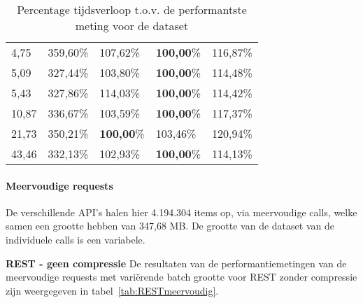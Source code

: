 \begin{table}
\begin{tabular}{lllll}
        4,75 & 359,60\% & 107,62\% & \textbf{100,00}\% & 116,87\% \\
        5,09 & 327,44\% & 103,80\% & \textbf{100,00}\% & 114,48\% \\
        5,43 & 327,86\% & 114,03\% & \textbf{100,00}\% & 114,42\% \\
        10,87 & 336,67\% & 103,59\% & \textbf{100,00}\% & 117,37\% \\
        21,73 & 350,21\% & \textbf{100,00}\% & 103,46\% & 120,94\% \\
        43,46 & 332,13\% & 102,93\% & \textbf{100,00}\% & 114,13\% \\
        \bottomrule
    \end{tabular}
    \caption{Percentage tijdsverloop t.o.v. de performantste meting voor de dataset}
    \label{tab:REST_RESTcompressie_gRPCUni_gRPCMultipercentage}
\end{table}


\paragraph{Meervoudige requests}

De verschillende API's halen hier 4.194.304 items op, via meervoudige calls, welke samen een grootte hebben van 347,68 MB. De grootte van de dataset van de individuele calls
is een variabele.

\textbf{REST - geen compressie}\newline
De resultaten van de performantiemetingen van de meervoudige requests met vari\"erende batch grootte voor REST zonder compressie zijn weergegeven in tabel~\ref{tab:RESTmeervoudig}.

